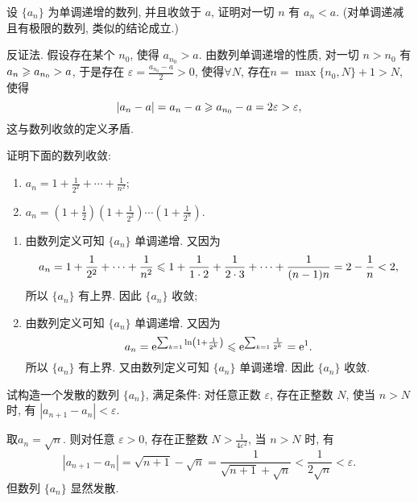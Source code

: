 \begin{exercise}[1.C.2]
    设 $\{a_n\}$ 为单调递增的数列,  并且收敛于 $a$,  证明对一切 $n$ 有 $a_n < a$. (对单调递减且有极限的数列,  类似的结论成立.)
\end{exercise}

\begin{solution}
    反证法. 假设存在某个 $n_0$,  使得 $a_{n_0} > a$. 由数列单调递增的性质,  对一切 $n > n_0$ 有 $a_n \geqslant a_{n_0} > a$, 于是存在 $\varepsilon = \frac{a_{n_0} - a}{2} > 0$,  使得$\forall N$,  存在$ n = \max\{n_0,  N\} + 1 > N$,  使得
    $$ |a_n - a| = a_n - a \geqslant a_{n_0} - a = 2\varepsilon > \varepsilon,  $$
    这与数列收敛的定义矛盾.
\end{solution}

\begin{exercise}[1.C.3]
    证明下面的数列收敛:
    \begin{enumerate}[(1)]
        \item $a_n = 1 + \frac{1}{2^2} + \cdots + \frac{1}{n^2}$;
        \item $a_n = \left(1+\frac{1}{2}\right)\left(1+\frac{1}{2^2}\right)\cdots\left(1+\frac{1}{2^n}\right)$.
    \end{enumerate}
\end{exercise}

\begin{solution}
    \begin{enumerate}[(1)]
        \item 由数列定义可知 $\{a_n\}$ 单调递增. 又因为
              $$ a_n = 1 + \frac{1}{2^2} + \cdots + \frac{1}{n^2} \leqslant 1 + \frac{1}{1 \cdot 2} + \frac{1}{2 \cdot 3} + \cdots + \frac{1}{(n-1)n} = 2 - \frac{1}{n} < 2,  $$
              所以 $\{a_n\}$ 有上界. 因此 $\{a_n\}$ 收敛;
        \item 由数列定义可知 $\{a_n\}$ 单调递增. 又因为
              $$a_n = \mathrm{e}^{\sum_{k=1} \ln \left(1 + \frac{1}{2^k}\right)} \leqslant \mathrm{e}^{\sum_{k=1} \frac{1}{2^k}} = \mathrm{e}^1.$$
              所以 $\{a_n\}$ 有上界. 又由数列定义可知 $\{a_n\}$ 单调递增. 因此 $\{a_n\}$ 收敛.
    \end{enumerate}
\end{solution}

\begin{exercise}[1.C.4]
    试构造一个发散的数列 $\{a_n\}$,  满足条件: 对任意正数 $\varepsilon$,  存在正整数 $N$,  使当 $n > N$ 时,  有 $|a_{n+1}-a_n| < \varepsilon$.
\end{exercise}

\begin{solution}
    取$a_n = \sqrt{n}$. 则对任意 $\varepsilon > 0$,  存在正整数 $N > \frac{1}{4\varepsilon^2}$,  当 $n > N$ 时,  有
    $$ |a_{n+1}-a_n| = \sqrt{n+1} - \sqrt{n} = \frac{1}{\sqrt{n+1} + \sqrt{n}} < \frac{1}{2\sqrt{n}} < \varepsilon. $$
    但数列 $\{a_n\}$ 显然发散.
\end{solution}

